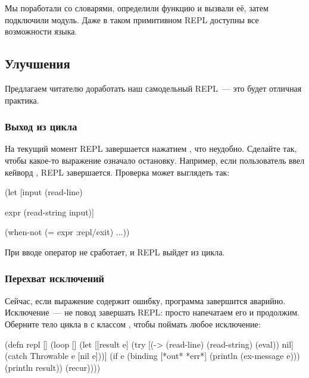 Мы поработали со словарями, определили функцию и вызвали её, затем подключили модуль. Даже в таком примитивном REPL доступны все возможности языка.

\subsection{Улучшения}

Предлагаем читателю доработать наш самодельный REPL~--- это будет отличная практика.


\subsubsection{Выход из цикла}

На текущий момент REPL завершается нажатием , что неудобно. Сделайте так, чтобы какое-то выражение означало остановку. Например, если пользователь ввел кейворд , REPL завершается. Проверка может выглядеть так:

\begin{english}
  \begin{clojure}
(let [input
      (read-line)

      expr
      (read-string input)]

  (when-not (= expr :repl/exit)
    ...))
  \end{clojure}
\end{english}

При вводе  оператор  не сработает, и REPL выйдет из цикла.

\subsubsection{Перехват исключений}


Сейчас, если выражение содержит ошибку, программа завершится аварийно. Исключение~--- не повод завершать REPL: просто напечатаем его и продолжим. Оберните тело цикла в  с классом , чтобы поймать любое исключение:

\begin{english}
  \begin{clojure/lines}
(defn repl []
  (loop []
    (let [[result e]
          (try
            [(-> (read-line)
                 (read-string)
                 (eval))
             nil]
            (catch Throwable e
              [nil e]))]
      (if e
        (binding [*out* *err*]
          (println (ex-message e)))
        (println result))
      (recur))))
  \end{clojure/lines}
\end{english}

